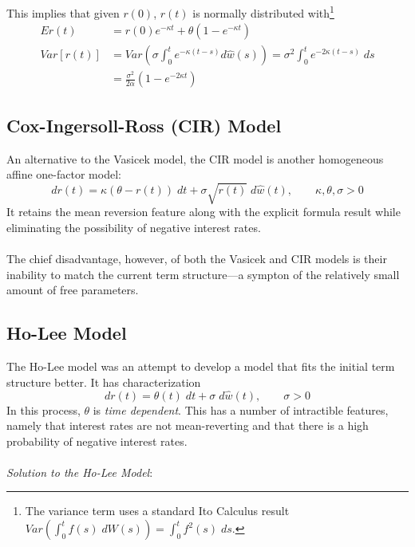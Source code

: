 \documentclass[a4paper,12pt]{scrartcl}
\begin{document}
This implies that given $r(0)$, $r(t)$ is normally distributed 
with\footnote{The variance term uses
a standard Ito Calculus result 
$Var \left( \int^t_0 f(s) \; dW(s) \right) = \int^t_0 f^2(s) \; ds$.} 
\begin{align*}
   Er(t) &= r(0) e^{-\kappa t} + \theta(1- e^{-\kappa t}) \\
   Var[ r(t)]&= Var \left(\sigma \int^t_0 e^{-\kappa (t-s)}d\hat{w}(s)
      \right) = \sigma^2 \int^t_0 e^{-2 \kappa (t-s)} \; ds\\
      &= \frac{\sigma^2}{2\alpha} \left( 1 - e^{-2\kappa t} \right) 
\end{align*}

\newpage 
\subsection{Cox-Ingersoll-Ross (CIR) Model}

An alternative to the Vasicek model, the CIR model is another
homogeneous affine one-factor model:
\begin{equation}
   \label{cir}
   dr(t) = \kappa(\theta - r(t)) \; dt + \sigma \sqrt{r(t)} \; 
      d\hat{w}(t), \qquad \kappa, \theta, \sigma > 0
\end{equation}
It retains the mean reversion feature along with the explicit formula
result while eliminating the possibility of negative interest rates.
\\
\\
The chief disadvantage, however, of both the Vasicek and CIR models
is their inability to match the current term structure---a sympton
of the relatively small amount of free parameters.

\newpage
\subsection{Ho-Lee Model}

The Ho-Lee model was an attempt to develop a model that fits the
initial term structure better. It has characterization
\begin{equation}
   \label{holee}
   dr(t) = \theta(t) \; dt + \sigma \; d\hat{w}(t), \qquad \sigma >0
\end{equation}
In this process, $\theta$ is \emph{time dependent}. This has
a number of intractible features, namely that interest rates are 
not mean-reverting and that there is a high probability of negative 
interest rates.
\\
\\
{\sl Solution to the Ho-Lee Model}: 
\end{document}
